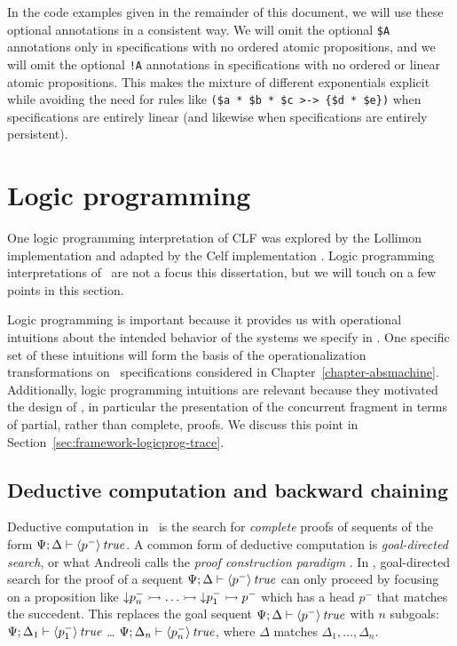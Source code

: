 In the code examples given in the remainder of this document, we will
use these optional annotations in a consistent way.  We will omit the
optional \verb|$A| annotations only in specifications with no ordered
atomic propositions, and we will omit the optional \verb|!A|
annotations in specifications with no ordered or linear atomic
propositions. This makes the mixture of different exponentials
explicit while avoiding the need for rules like
\verb|($a * $b * $c >-> {$d * $e})| when specifications are entirely
linear (and likewise when specifications are entirely persistent).

\section{Logic programming}
\label{sec:framework-logicprog}

One logic programming interpretation of CLF was explored by the
Lollimon implementation \cite{lopez05monadic} and adapted by the Celf
implementation
\cite{schacknielsen08celf,schacknielsen11implementing}. Logic
programming interpretations of \sls~are not a focus this dissertation, but
we will touch on a few points in this section.

Logic programming is important because it provides us with operational
intuitions about the intended behavior of the systems we specify in
\sls. One specific set of these intuitions will form the basis of the
operationalization transformations on \sls~specifications considered
in Chapter~\ref{chapter-absmachine}. 
Additionally, logic programming intuitions are relevant
because they motivated the design of \sls, in particular the
presentation of the concurrent fragment in terms of partial, rather
than complete, proofs. We discuss this point in
Section~\ref{sec:framework-logicprog-trace}.

\subsection{Deductive computation and backward chaining}
\label{sec:framework-logicprog-deductive}
\label{sec:framework-modes}

Deductive computation in \sls~is the search for {\it complete} proofs
of sequents of the form ${\Psi};{\Delta} \vdash {{\langle {p^-} \rangle}\,{{\it true}}} \mathstrut$.  A
common form of deductive computation is {\it goal-directed search}, or
what Andreoli calls the {\it proof construction paradigm}
\cite{andreoli01focussing}.
In \sls, goal-directed search for the proof of a sequent
${\Psi};{\Delta} \vdash {{\langle {p^-} \rangle}\,{{\it true}}} \mathstrut$ can only proceed by focusing
on a proposition like ${\downarrow}p_n^- \rightarrowtail \ldots \rightarrowtail
{\downarrow}p_1^- \rightarrowtail p^-$ which has a head $p^-$ that matches the
succedent. This replaces the goal sequent
${\Psi};{\Delta} \vdash {{\langle {p^-} \rangle}\,{{\it true}}} \mathstrut$ with $n$ subgoals:
${\Psi};{\Delta_1} \vdash {{\langle {p_1^-} \rangle}\,{{\it true}}} \mathstrut$ \ldots
${\Psi};{\Delta_n} \vdash {{\langle {p_n^-} \rangle}\,{{\it true}}} \mathstrut$, where $\Delta$ matches
$\Delta_1,\ldots,\Delta_n$.

